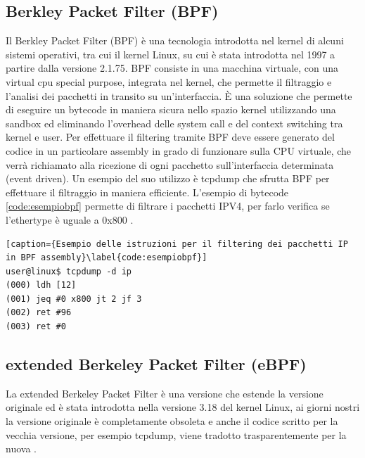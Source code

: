 \subsection{Berkley Packet Filter (BPF)}

Il Berkley Packet Filter (BPF) è una tecnologia introdotta nel kernel di alcuni sistemi operativi, tra cui il kernel Linux, su cui è stata introdotta nel 1997 a partire dalla versione 2.1.75. BPF consiste in una macchina virtuale, con una virtual cpu special purpose, integrata nel kernel, che permette il filtraggio e l'analisi dei pacchetti in transito su un'interfaccia.
È una soluzione che permette di eseguire un bytecode in maniera sicura nello spazio kernel utilizzando una sandbox ed eliminando l'overhead delle system call e del context switching tra kernel e user. 
Per effettuare il filtering tramite BPF deve essere generato del codice in un particolare assembly in grado di funzionare sulla CPU virtuale, che verrà richiamato alla ricezione di ogni pacchetto sull'interfaccia determinata (event driven). 
Un esempio del suo utilizzo è tcpdump che sfrutta BPF per effettuare il filtraggio in maniera efficiente. L'esempio di bytecode \ref{code:esempiobpf} permette di filtrare i pacchetti IPV4, per farlo verifica se l'ethertype è uguale a 0x800 \cite{risso_ebpf}.


\begin{lstlisting}[caption={Esempio delle istruzioni per il filtering dei pacchetti IP in BPF assembly}\label{code:esempiobpf}]
user@linux$ tcpdump -d ip
(000) ldh [12]
(001) jeq #0 x800 jt 2 jf 3
(002) ret #96
(003) ret #0
\end{lstlisting}

\subsection{extended Berkeley Packet Filter (eBPF)}

La extended Berkeley Packet Filter è una versione che estende la versione originale ed è stata introdotta nella versione 3.18 del kernel Linux, ai giorni nostri la versione originale è completamente obsoleta e anche il codice scritto per la vecchia versione, per esempio tcpdump, viene tradotto trasparentemente per la nuova \cite{cilium_ebpf}.

